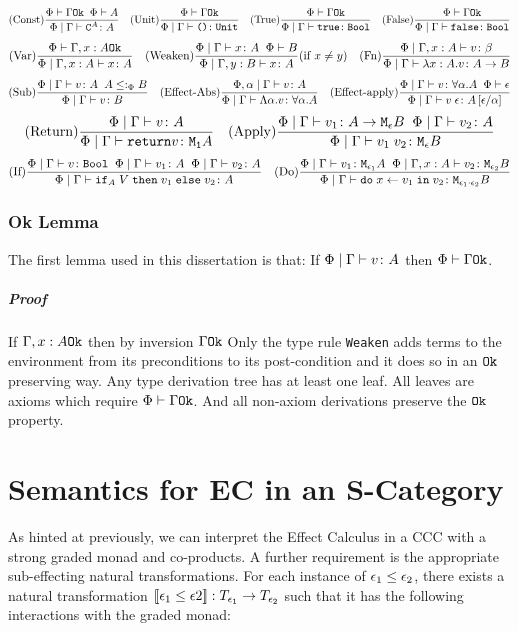\documentclass{Report}
\begin{document}
\[
    (\text{Const}) \frac{\Phi\vdash \Gamma \texttt{Ok}\;\;\Phi\vdash A}{\Phi\mid\Gamma \vdash \texttt{C}^{A} \colon A} 
    \quad
    (\text{Unit}) \frac{\Phi\vdash \Gamma \texttt{Ok}}{\Phi\mid\Gamma \vdash \texttt{()} \colon \texttt{Unit}} 
    \quad
    (\text{True}) \frac{\Phi\vdash \Gamma \texttt{Ok}}{\Phi\mid\Gamma \vdash \texttt{true} \colon \texttt{Bool}}
    \quad
    (\text{False}) \frac{\Phi\vdash \Gamma \texttt{Ok}}{\Phi\mid\Gamma \vdash \texttt{false} \colon \texttt{Bool}}
\]
\[
(\text{Var}) \frac{\Phi\vdash \Gamma, x: A \texttt{Ok}}{\Phi\mid\Gamma, x: A \vdash x \colon A}
\quad
(\text{Weaken}) \frac{\Phi\mid\Gamma \vdash x \colon A\;\;\Phi\vdash B}{\Phi\mid\Gamma, y: B \vdash x \colon A}(\text{if } x \neq y)
\quad
(\text{Fn}) \frac{\Phi\mid\Gamma, x: A \vdash v \colon \beta}{\Phi\mid\Gamma \vdash \lambda x : A. v \colon A\rightarrow B}
\]
\[
    (\text{Sub}) \frac{\Phi\mid\Gamma \vdash v \colon A\;\; A \leq:_\Phi B}{\Phi\mid\Gamma \vdash v \colon B}
    \quad
    (\text{Effect-Abs}) \frac{\Phi,\alpha\mid\Gamma \vdash v \colon A}{\Phi\mid\Gamma \vdash \Lambda \alpha. v \colon \forall \alpha. A}
    \quad
    (\text{Effect-apply}) \frac{\Phi\mid\Gamma \vdash v \colon \forall \alpha. A\;\;\Phi\vdash \epsilon}{\Phi\mid\Gamma \vdash v\;\epsilon \colon A\left[\epsilon / \alpha\right]}
\]
\[
    (\text{Return}) \frac{\Phi\mid\Gamma \vdash v \colon A}{\Phi\mid\Gamma \vdash \texttt{return} v \colon \texttt{M}_{\texttt{1}}{A}}
    \quad
    (\text{Apply}) \frac{\Phi\mid\Gamma \vdash v_1 \colon A \rightarrow \texttt{M}_{\epsilon}{B}\;\;\Phi\mid\Gamma \vdash v_2 \colon A}{\Phi\mid\Gamma \vdash v_1\; v_2 \colon \texttt{M}_{\epsilon}{B}}
\]
\[
    (\text{If}) \frac{\Phi\mid\Gamma \vdash v \colon \texttt{Bool} \;\; \Phi\mid\Gamma \vdash v_1 \colon A\;\;\Phi\mid\Gamma \vdash v_2 \colon A}{\Phi\mid\Gamma \vdash \texttt{if}_{A}\; V\; \texttt{then}\; v_1 \;\texttt{else} \; v_2 \colon A}
    \quad
    (\text{Do}) \frac{\Phi\mid\Gamma \vdash v_1 \colon \texttt{M}_{\epsilon_1}{A} \;\; \Phi\mid\Gamma, x: A \vdash v_2 \colon \texttt{M}_{\epsilon_2}{B}}{\Phi\mid\Gamma \vdash \texttt{do}\; x \leftarrow v_1 \;\texttt{in}\; v_2 \colon \texttt{M}_{\epsilon_1 \cdot \epsilon_2}{B}}
\]

\subsection{Ok Lemma} The first lemma used in this dissertation is that: If $\Phi\mid\Gamma \vdash v \colon A$ then $\Phi\vdash \Gamma \texttt{Ok}$.
\paragraph{Proof}
If $\Gamma, x: A \texttt{Ok}$ then by inversion $\Gamma \texttt{Ok}$
Only the type rule \texttt{Weaken} adds terms to the environment from its preconditions to its post-condition and it does so in an $\texttt{Ok}$ preserving way. Any type derivation tree has at least one leaf. All leaves are axioms which require $\Phi\vdash \Gamma \texttt{Ok}$. And all non-axiom derivations preserve the $\texttt{Ok}$ property.


\chapter{Semantics for EC in an S-Category}
As hinted at previously, we can interpret the Effect Calculus in a CCC with a strong graded monad and co-products. A further requirement is the appropriate sub-effecting natural transformations. For each instance of $\epsilon_1 \leq \epsilon_2$, there exists a natural transformation ${\bf [\![}\epsilon_1\leq\epsilon2{\bf ]\!]}: T_{\epsilon_1}{}\rightarrow T_{\epsilon_2}{}$ such that it has the following interactions with the graded monad:
\end{document}
